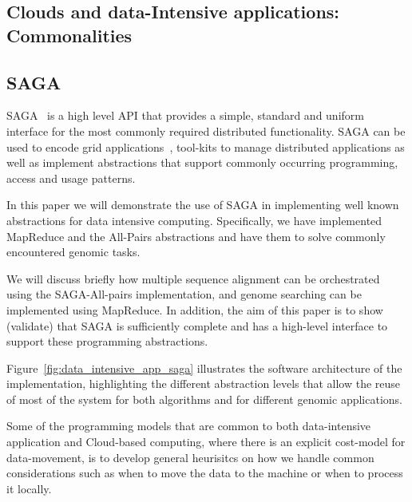 \documentclass[conference,final]{IEEEtran}
\newcommand{\jhanote}[1]{ {\textcolor{red} { ***SJ: #1 }}}
\newcommand{\jhanote}[1]{}
\begin{document}

\subsection{Clouds and data-Intensive applications: Commonalities}

\subsection{SAGA}
SAGA~\cite{saga_gfd90} is a high level API that provides a simple,
standard and uniform interface for the most commonly required
distributed functionality.  SAGA can be used to encode grid
applications~\cite{saga_escience07, saga_tg08}, tool-kits to manage
distributed applications as well as implement abstractions that
support commonly occurring programming, access and usage patterns.

In this paper we will demonstrate the use of SAGA in implementing well
known abstractions for data intensive computing.  Specifically, we
have implemented MapReduce and the All-Pairs abstractions and have
them to solve commonly encountered genomic tasks.

We will discuss briefly how multiple sequence alignment can be
orchestrated using the SAGA-All-pairs implementation, and genome
searching can be implemented using MapReduce.  In addition, the aim of
this paper is to show (validate) that SAGA is sufficiently complete
and has a high-level interface to support these programming
abstractions.

Figure~\ref{fig:data_intensive_app_saga} illustrates the software
architecture of the implementation, highlighting the different
abstraction levels that allow the reuse of most of the system for both
algorithms and for different genomic applications.

Some of the programming models that are common to both data-intensive
application and Cloud-based computing, where there is an explicit
cost-model for data-movement, is to develop general heurisitcs on how
we handle common considerations such as when to move the data to the
machine or when to process it locally.
\end{document}
